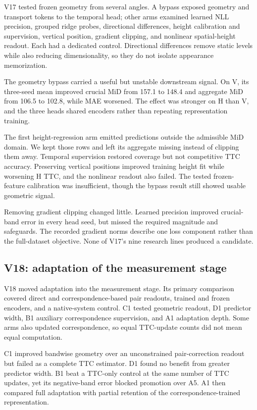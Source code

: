 V17 tested frozen geometry from several angles. A bypass exposed geometry and transport tokens to the temporal head; other arms examined learned NLL precision, grouped ridge probes, directional differences, height calibration and supervision, vertical position, gradient clipping, and nonlinear spatial-height readout. Each had a dedicated control. Directional differences remove static levels while also reducing dimensionality, so they do not isolate appearance memorization.

The geometry bypass carried a useful but unstable downstream signal. On V, its three-seed mean improved crucial MiD from 157.1 to 148.4 and aggregate MiD from 106.5 to 102.8, while MAE worsened. The effect was stronger on H than V, and the three heads shared encoders rather than repeating representation training. 

The first height-regression arm emitted predictions outside the admissible MiD domain. We kept those rows and left its aggregate missing instead of clipping them away. Temporal supervision restored coverage but not competitive TTC accuracy. Preserving vertical positions improved training height fit while worsening H TTC, and the nonlinear readout also failed. The tested frozen-feature calibration was insufficient, though the bypass result still showed usable geometric signal.

Removing gradient clipping changed little. Learned precision improved crucial-band error in every head seed, but missed the required magnitude and safeguards. The recorded gradient norms describe one loss component rather than the full-dataset objective. None of V17's nine research lines produced a candidate. 

\subsection{V18: adaptation of the measurement stage}

V18 moved adaptation into the measurement stage. Its primary comparison covered direct and correspondence-based pair readouts, trained and frozen encoders, and a native-system control. C1 tested geometric readout, D1 predictor width, B1 auxiliary correspondence supervision, and A1 adaptation depth. Some arms also updated correspondence, so equal TTC-update counts did not mean equal computation.

C1 improved bandwise geometry over an unconstrained pair-correction readout but failed as a complete TTC estimator. D1 found no benefit from greater predictor width. B1 beat a TTC-only control at the same number of TTC updates, yet its negative-band error blocked promotion over A5. A1 then compared full adaptation with partial retention of the correspondence-trained representation.

